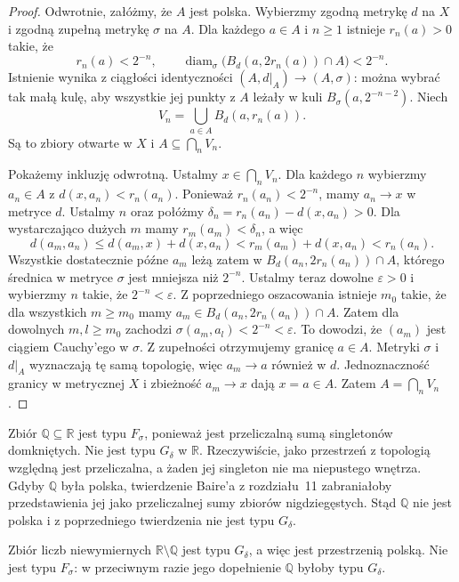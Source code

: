\begin{proof}
Odwrotnie, załóżmy, że
$A$ jest polska.
Wybierzmy zgodną metrykę $d$
na $X$ i zgodną zupełną
metrykę $\sigma$ na $A$.
Dla każdego $a\in A$ i $n\ge1$
istnieje $r_n(a)>0$ takie, że
\[
r_n(a)<2^{-n},\qquad
\operatorname{diam}_{\sigma}
\bigl(B_d(a,2r_n(a))\cap A\bigr)
<2^{-n}.
\]
Istnienie wynika z ciągłości
identyczności
$(A,d|_A)\to(A,\sigma)$:
można wybrać tak małą kulę,
aby wszystkie jej punkty z $A$
leżały w kuli
$B_\sigma(a,2^{-n-2})$.
Niech
\[
V_n=\bigcup_{a\in A}
 B_d(a,r_n(a)).
\]
Są to zbiory otwarte w $X$
i $A\subseteq\bigcap_n V_n$.

Pokażemy inkluzję odwrotną.
Ustalmy $x\in\bigcap_nV_n$.
Dla każdego $n$ wybierzmy
$a_n\in A$ z
$d(x,a_n)<r_n(a_n)$.
Ponieważ $r_n(a_n)<2^{-n}$,
mamy $a_n\to x$ w metryce $d$.
Ustalmy $n$ oraz połóżmy
$\delta_n=r_n(a_n)-d(x,a_n)>0$.
Dla wystarczająco dużych $m$
mamy $r_m(a_m)<\delta_n$,
a więc
\[
d(a_m,a_n)
\le d(a_m,x)+d(x,a_n)
<r_m(a_m)+d(x,a_n)
<r_n(a_n).
\]
Wszystkie dostatecznie późne
$a_m$ leżą zatem w
$B_d(a_n,2r_n(a_n))\cap A$,
którego średnica w metryce
$\sigma$ jest mniejsza niż
$2^{-n}$. Ustalmy teraz dowolne
$\varepsilon>0$ i wybierzmy
$n$ takie, że $2^{-n}<\varepsilon$.
Z poprzedniego oszacowania
istnieje $m_0$ takie, że
dla wszystkich $m\ge m_0$
mamy
$a_m\in B_d(a_n,2r_n(a_n))\cap A$.
Zatem dla dowolnych
$m,l\ge m_0$ zachodzi
$\sigma(a_m,a_l)<2^{-n}<\varepsilon$.
To dowodzi, że $(a_m)$
jest ciągiem Cauchy'ego w $\sigma$. Z zupełności
otrzymujemy granicę $a\in A$.
Metryki $\sigma$ i $d|_A$
wyznaczają tę samą topologię,
więc $a_m\to a$ również w $d$.
Jednoznaczność granicy w
metrycznej $X$ i zbieżność
$a_m\to x$ dają $x=a\in A$.
Zatem $A=\bigcap_nV_n$.
\end{proof}

\begin{przyklad}
\label{ex:topog-polskie-wymierne}
Zbiór $\mathbb Q\subseteq\mathbb R$
jest typu $F_\sigma$, ponieważ
jest przeliczalną sumą singletonów
domkniętych. Nie jest typu
$G_\delta$ w $\mathbb R$.
Rzeczywiście, jako przestrzeń
z topologią względną jest
przeliczalna, a żaden jej
singleton nie ma niepustego
wnętrza. Gdyby $\mathbb Q$
była polska, twierdzenie Baire'a
z rozdziału~11 zabraniałoby
przedstawienia jej jako
przeliczalnej sumy zbiorów
nigdziegęstych. Stąd
$\mathbb Q$ nie jest polska
i z poprzedniego twierdzenia
nie jest typu $G_\delta$.

Zbiór liczb niewymiernych
$\mathbb R\setminus\mathbb Q$
jest typu $G_\delta$, a więc
jest przestrzenią polską.
Nie jest typu $F_\sigma$:
w przeciwnym razie jego
dopełnienie $\mathbb Q$
byłoby typu $G_\delta$.
\end{przyklad}

